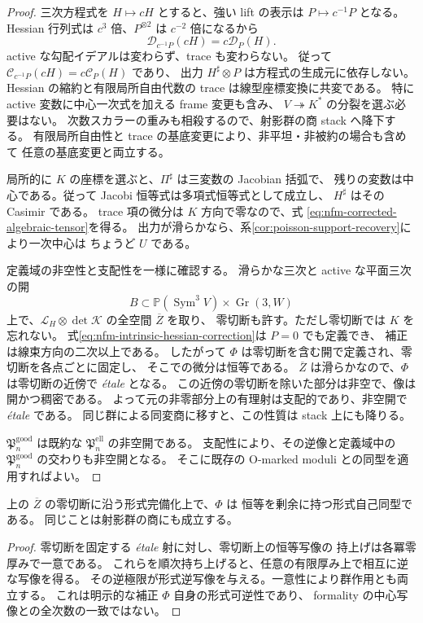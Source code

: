 \begin{proof}
三次方程式を $H\mapsto cH$ とすると、強い lift の表示は
$P\mapsto c^{-1}P$ となる。
Hessian 行列式は $c^3$ 倍、$P^{\otimes2}$ は $c^{-2}$ 倍になるから
\[
 \mathcal D_{c^{-1}P}(cH)=c\mathcal D_P(H).
\]
active な勾配イデアルは変わらず、trace も変わらない。
従って $\mathcal C_{c^{-1}P}(cH)=c\mathcal C_P(H)$ であり、
出力 $H^\sharp\otimes P$ は方程式の生成元に依存しない。
Hessian の縮約と有限局所自由代数の trace は線型座標変換に共変である。
特に active 変数に中心一次式を加える frame 変更も含み、
$V\twoheadrightarrow K^*$ の分裂を選ぶ必要はない。
次数スカラーの重みも相殺するので、射影群の商 stack へ降下する。
有限局所自由性と trace の基底変更により、非平坦・非被約の場合も含めて
任意の基底変更と両立する。

局所的に $K$ の座標を選ぶと、$\Pi^\sharp$ は三変数の Jacobian 括弧で、
残りの変数は中心である。従って Jacobi 恒等式は多項式恒等式として成立し、
$H^\sharp$ はその Casimir である。
trace 項の微分は $K$ 方向で零なので、式
\eqref{eq:nfm-corrected-algebraic-tensor}を得る。
出力が滑らかなら、系\ref{cor:poisson-support-recovery}により一次中心は
ちょうど $U$ である。

定義域の非空性と支配性を一様に確認する。
滑らかな三次と active な平面三次の開
\[
 B\subset\mathbb P(\operatorname{Sym}^3V)\times\operatorname{Gr}(3,W)
\]
上で、$\mathcal L_H\otimes\det\mathcal K$ の全空間 $\overline Z$ を取り、
零切断も許す。ただし零切断では $K$ を忘れない。
式\eqref{eq:nfm-intrinsic-hessian-correction}は $P=0$ でも定義でき、
補正は線束方向の二次以上である。
したがって $\Phi$ は零切断を含む開で定義され、零切断を各点ごとに固定し、
そこでの微分は恒等である。
$\overline Z$ は滑らかなので、$\Phi$ は零切断の近傍で \emph{\'etale} となる。
この近傍の零切断を除いた部分は非空で、像は開かつ稠密である。
よって元の非零部分上の有理射は支配的であり、非空開で \emph{\'etale} である。
同じ群による同変商に移すと、この性質は stack 上にも降りる。

$\mathfrak P_n^{\mathrm{good}}$ は既約な
$\mathfrak P_n^{\mathrm{ell}}$ の非空開である。
支配性により、その逆像と定義域中の
$\mathfrak P_n^{\mathrm{good}}$ の交わりも非空開となる。
そこに既存の O-marked moduli との同型を適用すればよい。
\end{proof}

\begin{corollary}
\label{cor:nfm-correction-formal-automorphism}
上の $\overline Z$ の零切断に沿う形式完備化上で、$\Phi$ は
恒等を剰余に持つ形式自己同型である。
同じことは射影群の商にも成立する。
\end{corollary}
\begin{proof}
零切断を固定する \emph{\'etale} 射に対し、零切断上の恒等写像の
持上げは各冪零厚みで一意である。
これらを順次持ち上げると、任意の有限厚み上で相互に逆な写像を得る。
その逆極限が形式逆写像を与える。一意性により群作用とも両立する。
これは明示的な補正 $\Phi$ 自身の形式可逆性であり、
formality の中心写像との全次数の一致ではない。
\end{proof}

